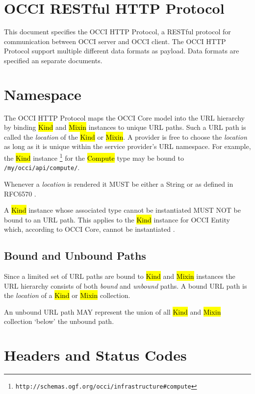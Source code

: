 \documentclass[10pt,a4paper]{article}
\begin{document}
\section{OCCI RESTful HTTP Protocol}

This document specifies the OCCI HTTP Protocol, a RESTful protocol for
communication between OCCI server and OCCI client. The OCCI HTTP Protocol
support multiple different data formats as payload. Data formats are specified
an separate documents.

\section{Namespace}

The OCCI HTTP Protocol maps the OCCI Core model into the URL hierarchy by binding
\hl{Kind} and \hl{Mixin} instances to unique URL paths. Such a URL path is called
the {\em location} of the \hl{Kind} or \hl{Mixin}.
A provider is free to choose the {\em location} as long as it is unique
within the service provider's URL namespace.
For example, the \hl{Kind} instance%
\footnote{\tt http://schemas.ogf.org/occi/infrastructure\#compute}
for the \hl{Compute} type may be bound to {\tt /my/occi/api/compute/}.

Whenever a {\em location} is rendered it MUST be either a String or as
defined in RFC6570 \cite{rfc6570}.

A \hl{Kind} instance whose associated type cannot be instantiated MUST NOT be
bound to an URL path. This applies to the \hl{Kind} instance for OCCI Entity
which, according to OCCI Core, cannot be instantiated \cite{occi:core}.

\subsection{Bound and Unbound Paths}

Since a limited set of URL paths are bound to \hl{Kind} and \hl{Mixin}
instances the URL hierarchy consists of both {\em bound} and {\em unbound}
paths.
A bound URL path is the {\em location} of a \hl{Kind} or \hl{Mixin} collection.

An unbound URL path MAY represent the union of all \hl{Kind} and \hl{Mixin}
collection `below' the unbound path.

\section{Headers and Status Codes}
\end{document}
